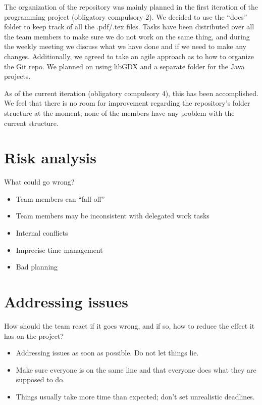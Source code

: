 \documentclass{article}
\begin{document}
The organization of the repository was mainly planned in the first iteration of the programming project (obligatory compulsory 2). We decided to use the “docs” folder to keep track of all the .pdf/.tex files. Tasks have been distributed over all the team members to make sure we do not work on the same thing, and during the weekly meeting we discuss what we have done and if we need to make any changes. Additionally, we agreed to take an agile approach as to how to organize the Git repo. We planned on using libGDX and a separate folder for the Java projects. 

As of the current iteration (obligatory compulsory 4), this has been accomplished. We feel that there is no room for improvement regarding the repository's folder structure at the moment; none of the members have any problem with the current structure.

\section*{Risk analysis}
What could go wrong?
\begin{itemize}
    \item Team members can “fall off”
    \item Team members may be inconsistent with delegated work tasks
    \item Internal conflicts
    \item Imprecise time management
    \item Bad planning
\end{itemize}

\section*{Addressing issues}
How should the team react if it goes wrong, and if so, how to reduce the effect it has on the project?
\begin{itemize}
    \item Addressing issues as soon as possible. Do not let things lie.
    \item Make sure everyone is on the same line and that everyone does what they are supposed to do.
    \item Things usually take more time than expected; don’t set unrealistic deadlines.
\end{itemize}
\end{document}
